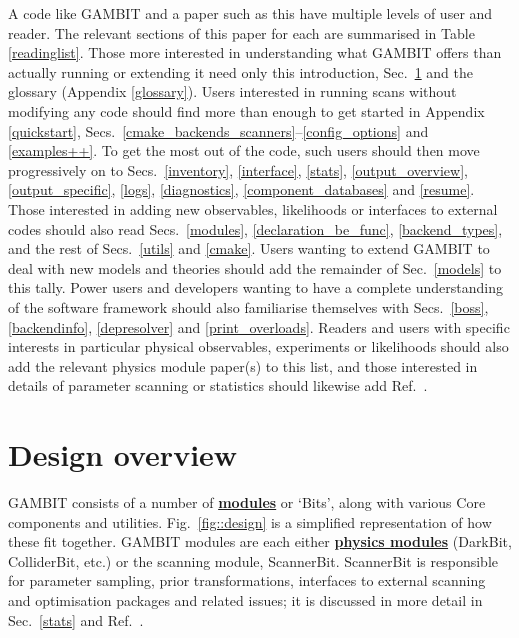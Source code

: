 \documentclass[pdftex,twocolumn,epjc3_preprint,runningheads]{svjour3}
\renewcommand{\_}{\discretionary{\underscore}{}{\underscore}}
\newcommand{\doublecross}[2]{\hyperref[#2]{\textbf{#1}}}
\newcommand{\gambit}{\textsf{GAMBIT}\xspace}
\newcommand{\darkbit}{\textsf{DarkBit}\xspace}
\newcommand{\colliderbit}{\textsf{ColliderBit}\xspace}
\newcommand{\scannerbit}{\textsf{ScannerBit}\xspace}
\newcommand{\GB}{\gambit}
\begin{document}
A code like \GB and a paper such as this have multiple levels of user and reader.  The relevant sections of this paper for each are summarised in Table \ref{readinglist}. Those more interested in understanding what \GB offers than actually running or extending it need only this introduction, Sec.\ \ref{design} and the glossary (Appendix \ref{glossary}).  Users interested in running scans without modifying any code should find more than enough to get started in Appendix \ref{quickstart}, Secs.\ \ref{cmake_backends_scanners}--\ref{config_options} and \ref{examples++}.  To get the most out of the code, such users should then move progressively on to Secs.\ \ref{inventory}, \ref{interface}, \ref{stats}, \ref{output_overview}, \ref{output_specific}, \ref{logs}, \ref{diagnostics}, \ref{component_databases} and \ref{resume}.  Those interested in adding new observables, likelihoods or interfaces to external codes should also read Secs.\ \ref{modules}, \ref{declaration_be_func}, \ref{backend_types}, and the rest of Secs.\ \ref{utils} and \ref{cmake}.  Users wanting to extend \GB to deal with new models and theories should add the remainder of Sec.\ \ref{models} to this tally.  Power users and developers wanting to have a complete understanding of the software framework should also familiarise themselves with Secs.\ \ref{boss}, \ref{backendinfo}, \ref{depresolver} and \ref{print_overloads}.  Readers and users with specific interests in particular physical observables, experiments or likelihoods should also add the relevant physics module paper(s) \cite{ColliderBit,FlavBit,DarkBit,SDPBit} to this list, and those interested in details of parameter scanning or statistics should likewise add Ref.\ \cite{ScannerBit}.

\section{Design overview}
\label{design}

\GB consists of a number of \doublecross{modules}{module} or `Bits', along with various Core components and utilities.  Fig.\ \ref{fig::design} is a simplified representation of how these fit together. \GB modules are each either \doublecross{physics modules}{physics module} (\darkbit, \colliderbit, etc.) or the scanning module, \scannerbit. \scannerbit is responsible for parameter sampling, prior transformations, interfaces to external scanning and optimisation packages and related issues; it is discussed in more detail in Sec.\ \ref{stats} and Ref.\ \cite{ScannerBit}.
\end{document}
